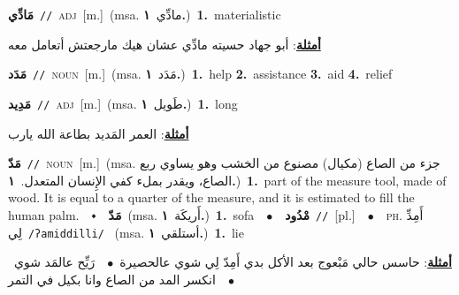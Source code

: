 \documentclass[10pt,a4paper,twoside]{article} %
\begin{document}
\begin{multicols}{2}
{\setlength\topsep{0pt}\textbf{\foreignlanguage{arabic}{مَادِّي}}\ {\color{gray}\texttt{//}\color{black}}\ \textsc{adj}\ [m.]\ \color{gray}(msa. \foreignlanguage{arabic}{مادِّي}~\foreignlanguage{arabic}{\textbf{١.}})\color{black}\ \textbf{1.}~materialistic\  \begin{flushright}\color{gray}\foreignlanguage{arabic}{\textbf{\underline{\foreignlanguage{arabic}{أمثلة}}}: أبو جهاد حسيته مادِّي عشان هيك مارجعتش أتعامل معه}\end{flushright}\color{black}} \vspace{2mm}

{\setlength\topsep{0pt}\textbf{\foreignlanguage{arabic}{مَدَد}}\ {\color{gray}\texttt{//}\color{black}}\ \textsc{noun}\ [m.]\ \color{gray}(msa. \foreignlanguage{arabic}{مَدَد}~\foreignlanguage{arabic}{\textbf{١.}})\color{black}\ \textbf{1.}~help  \textbf{2.}~assistance  \textbf{3.}~aid  \textbf{4.}~relief\ } \vspace{2mm}

{\setlength\topsep{0pt}\textbf{\foreignlanguage{arabic}{مَدِيد}}\ {\color{gray}\texttt{//}\color{black}}\ \textsc{adj}\ [m.]\ \color{gray}(msa. \foreignlanguage{arabic}{طَويل}~\foreignlanguage{arabic}{\textbf{١.}})\color{black}\ \textbf{1.}~long\  \begin{flushright}\color{gray}\foreignlanguage{arabic}{\textbf{\underline{\foreignlanguage{arabic}{أمثلة}}}: العمر المَديد بطاعة الله يارب}\end{flushright}\color{black}} \vspace{2mm}

{\setlength\topsep{0pt}\textbf{\foreignlanguage{arabic}{مَدّ}}\ {\color{gray}\texttt{//}\color{black}}\ \textsc{noun}\ [m.]\ \color{gray}(msa. \foreignlanguage{arabic}{جزء من الصاع (مكيال) مصنوع من الخشب وهو يساوي ربع الصاع، ويقدر بملء كفي الإِنسان المتعدل.}~\foreignlanguage{arabic}{\textbf{١.}})\color{black}\ \textbf{1.}~part of the measure tool, made of wood. It is equal to a quarter of the measure, and it is estimated to fill the human palm.\ \ $\smblkdiamond$\ \ \setlength\topsep{0pt}\textbf{\foreignlanguage{arabic}{مَدّ}}\ \color{gray}(msa. \foreignlanguage{arabic}{أَريكَة}~\foreignlanguage{arabic}{\textbf{١.}})\color{black}\ \textbf{1.}~sofa\ \ $\bullet$\ \ \setlength\topsep{0pt}\textbf{\foreignlanguage{arabic}{مْدُود}}\ {\color{gray}\texttt{//}\color{black}}\ [pl.]\ \ $\bullet$\ \ \textsc{ph.} \color{gray} \foreignlanguage{arabic}{أَمِدِّ لِي}\color{black}\ {\color{gray}\texttt{/{\sffamily ʔamiddilli}/}\color{black}}\ \color{gray} (msa. \foreignlanguage{arabic}{أستلقي}~\foreignlanguage{arabic}{\textbf{١.}})\color{black}\ \textbf{1.}~lie\  \begin{flushright}\color{gray}\foreignlanguage{arabic}{\textbf{\underline{\foreignlanguage{arabic}{أمثلة}}}: حاسس حالي مَبْعوج بعد الأكل بدي أَمِدّ لِي شوي عالحصيرة\ $\bullet$\ \  رَيِّح عالمَد شوي\ $\bullet$\ \  انكسر المد من الصاع وانا بكيل في التمر}\end{flushright}\color{black}} \vspace{2mm}


\end{multicols}
\end{document}

